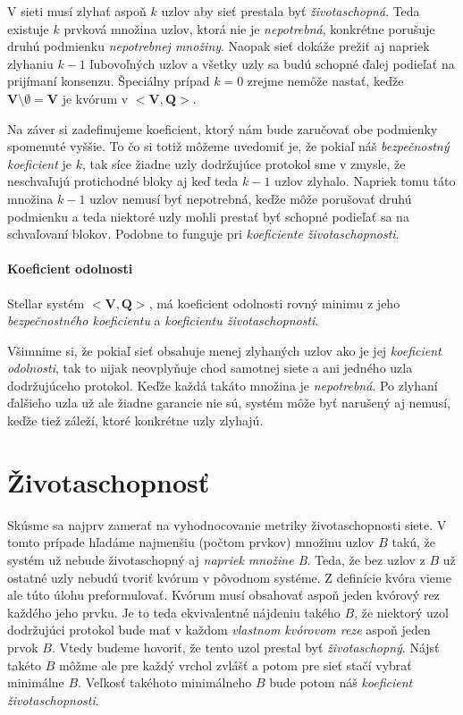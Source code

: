 \vspace{4mm}
V sieti musí zlyhať aspoň $k$ uzlov aby sieť prestala byť
\textit{životaschopná}. Teda existuje $k$ prvková množina uzlov, ktorá nie je
\textit{nepotrebná}, konkrétne porušuje druhú podmienku \textit{nepotrebnej množiny}.
Naopak sieť dokáže prežiť aj napriek zlyhaniu $k-1$ ľubovoľných uzlov a všetky uzly
sa budú schopné ďalej podieľať na prijímaní konsenzu.
Špeciálny prípad $k=0$ zrejme nemôže nastať, keďže
$\textbf{V} \setminus \emptyset = \textbf{V}$ je kvórum v $<\textbf{V},\textbf{Q}>$.

Na záver si zadefinujeme koeficient, ktorý nám bude zaručovať obe podmienky spomenuté
vyššie. To čo si totiž môžeme uvedomiť je, že pokiaľ náš \textit{bezpečnostný koeficient}
je $k$, tak síce žiadne uzly dodržujúce protokol sme  v zmysle, že
neschvaľujú protichodné bloky aj keď teda $k-1$ uzlov zlyhalo. Napriek tomu táto
množina $k-1$ uzlov nemusí byť nepotrebná, keďže môže porušovať druhú podmienku a teda
niektoré uzly mohli prestať byť schopné podieľať sa na schvaľovaní blokov.
Podobne to funguje pri \textit{koeficiente životaschopnosti}.

\paragraph {Koeficient odolnosti} Stellar systém $<\textbf{V},\textbf{Q}>$,
má koeficient odolnosti rovný minimu z jeho \textit{bezpečnostného koeficientu}
a \textit{koeficientu životaschopnosti}.

\vspace{4mm}
Všimnime si, že pokiaľ sieť obsahuje menej zlyhaných uzlov ako je jej
\textit{koeficient odolnosti}, tak to nijak neovplyňuje chod samotnej siete a ani
jedného uzla dodržujúceho protokol. Keďže každá takáto množina je \textit{nepotrebná}.
Po zlyhaní ďalšieho uzla už ale žiadne garancie nie sú, systém môže byť narušený
aj nemusí, keďže tiež záleží, ktoré konkrétne uzly zlyhajú.

\section {Životaschopnosť}

Skúsme sa najprv zamerať na vyhodnocovanie metriky životaschopnosti siete.
V tomto prípade hľadáme najmenšiu (počtom prvkov) množinu uzlov $B$ takú, že
systém už nebude životaschopný aj \textit{napriek množine B}.
Teda, že bez uzlov z $B$ už ostatné uzly nebudú tvoriť kvórum v pôvodnom systéme.
Z definície kvóra vieme ale túto úlohu preformulovať. Kvórum musí obsahovať
aspoň jeden kvórový rez každého jeho prvku.
Je to teda ekvivalentné nájdeniu takého $B$, že niektorý uzol dodržujúci protokol
bude mať v každom \textit{vlastnom kvórovom reze} aspoň jeden prvok $B$.
Vtedy budeme hovoriť, že tento uzol prestal byť \textit{životaschopný}.
Nájsť takéto $B$ môžme ale pre každý vrchol zvlášť a potom pre sieť stačí vybrať
minimálne $B$. Veľkosť takéhoto minimálneho $B$ bude potom náš \textit{koeficient
životaschopnosti}.

